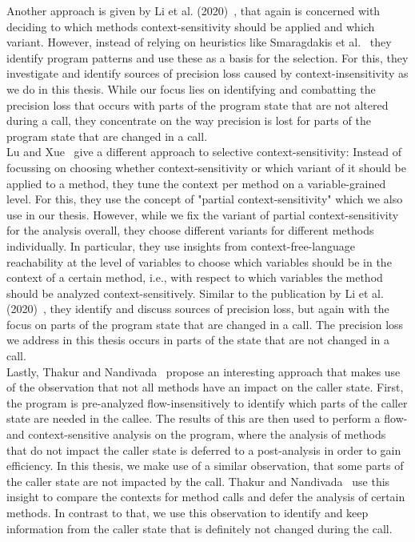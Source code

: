 Another approach is given by Li et al. (2020)~\parencite{li2020principled}, that again is concerned with deciding to which methods context-sensitivity should be applied and which variant. However, instead of relying on heuristics like Smaragdakis et al.~\parencite{smaragdakis2014introspective} they identify program patterns and use these as a basis for the selection. For this, they investigate and identify sources of precision loss caused by context-insensitivity as we do in this thesis. While our focus lies on identifying and combatting the precision loss that occurs with parts of the program state that are not altered during a call, they concentrate on the way precision is lost for parts of the program state that are changed in a call.\\
Lu and Xue~\parencite{lu2019precision} give a different approach to selective context-sensitivity: Instead of focussing on choosing whether context-sensitivity or which variant of it should be applied to a method, they tune the context per method on a variable-grained level. For this, they use the concept of "partial context-sensitivity" which we also use in our thesis. However, while we fix the variant of partial context-sensitivity for the analysis overall, they choose different variants for different methods individually. In particular, they use insights from context-free-language reachability at the level of variables to choose which variables should be in the context of a certain method, i.e., with respect to which variables the method should be analyzed context-sensitively. Similar to the publication by Li et al. (2020)~\parencite{li2020principled}, they identify and discuss sources of precision loss, but again with the focus on parts of the program state that are changed in a call. The precision loss we address in this thesis occurs in parts of the state that are not changed in a call.\\
Lastly, Thakur and Nandivada~\parencite{thakur2019compare} propose an interesting approach that makes use of the observation that not all methods have an impact on the caller state. First, the program is pre-analyzed flow-insensitively to identify which parts of the caller state are needed in the callee. The results of this are then used to perform a flow- and context-sensitive analysis on the program, where the analysis of methods that do not impact the caller state is deferred to a post-analysis in order to gain efficiency. In this thesis, we make use of a similar observation, that some parts of the caller state are not impacted by the call. Thakur and Nandivada~\parencite{thakur2019compare} use this insight to compare the contexts for method calls and defer the analysis of certain methods. In contrast to that, we use this observation to identify and keep information from the caller state that is definitely not changed during the call.\\
